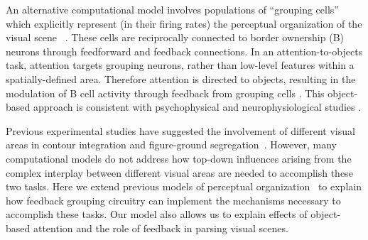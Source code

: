 An alternative computational model involves populations of ``grouping cells'' which explicitly represent (in their firing rates) the perceptual organization of the visual scene ~\citep{Craft_etal07}.  These cells are reciprocally connected to border ownership (B) neurons
through feedforward and feedback connections. In an attention-to-objects task, attention targets grouping neurons, rather
than low-level features within a spatially-defined area. Therefore
attention is directed to objects, resulting in the modulation of B cell activity through feedback from grouping cells \citep{Mihalas_etal11b}.  This object-based approach is consistent with psychophysical and
neurophysiological studies \citep[\eg][]{Duncan84,Egly_etal94,Scholl01,Kimchi_etal07,Qiu_etal07,Ho_Yeh09,Poort_etal12}.

Previous experimental studies have suggested the involvement of different visual areas in contour integration and figure-ground segregation~\citep{Poort_etal12,Chen_etal14}. However, many computational models do not address how top-down influences arising from the complex interplay between different visual areas are needed to accomplish these two tasks. Here we extend previous models of perceptual organization~\citep{Craft_etal07,Mihalas_etal11b} to explain how feedback grouping circuitry can implement the mechanisms necessary to accomplish these tasks. Our model also allows us to explain
effects of object-based attention and the role of feedback in parsing visual scenes.

